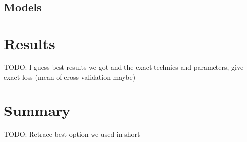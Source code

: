 \documentclass[10pt,conference,compsocconf]{IEEEtran}
\begin{document}
\subsection{Models}


\section{Results}

TODO: I guess best results we got and the exact technics and parameters, give exact loss (mean of cross validation maybe)

\section{Summary}

TODO: Retrace best option we used in short



\end{document}
